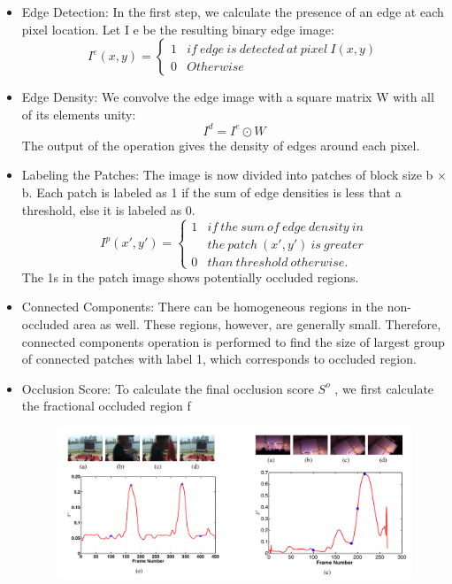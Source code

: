 \documentclass{sig-alternate}
\begin{document}
\begin{itemize}
\item Edge Detection: In the first step, we calculate the presence of
an edge at each pixel location. Let I e be the resulting binary
edge image:
\[I^e(x,y) = \left\{\begin{matrix} 1 & if\ edge\ is\ detected\ at\ pixel\ I(x,y)\\ 0 & Otherwise \end{matrix}\right.\tag{1}\]
\item Edge Density: We convolve the edge image with a square
matrix W with all of its elements unity:
\[I^d = I^e\odot W\tag{2}\]
The output of the operation gives the density of edges around
each pixel.
\item Labeling the Patches: The image is now divided into patches
of block size b × b. Each patch is labeled as 1 if the sum of
edge densities is less that a threshold, else it is labeled as 0.
\[I^p(x',y') = \left\{\begin{matrix} 1 & if\ the\ sum\ of\ edge\ density\ in \\ & the\ patch\ (x',y')\ is\ greater\\ 0& than\ threshold\ otherwise. \end{matrix}\right.\tag{3}\]
The 1s in the patch image shows potentially occluded regions.
\item Connected Components: There can be homogeneous regions
in the non-occluded area as well. These regions, however, are
generally small. Therefore, connected components operation
is performed to find the size of largest group of connected
patches with label 1, which corresponds to occluded region.
\item Occlusion Score: To calculate the final occlusion score $S^o$ ,
we first calculate the fractional occluded region f 
\begin{figure}
  \includegraphics[width=\textwidth]{three.pdf}
\end{figure}\\

\end{itemize}
\end{document}
